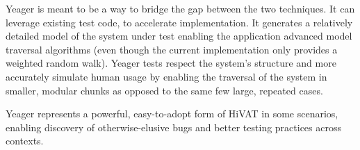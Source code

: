 Yeager is meant to be a way to bridge the gap between the two techniques. It can leverage existing test code, to accelerate implementation. It generates a relatively detailed model of the system under test enabling the application advanced model traversal algorithms (even though the current implementation only provides a weighted random walk). Yeager tests respect the system's structure and more accurately simulate human usage by enabling the traversal of the system in smaller, modular chunks as opposed to the same few large, repeated cases.

Yeager represents a powerful, easy-to-adopt form of HiVAT in some scenarios, enabling discovery of otherwise-elusive bugs and better testing practices across contexts.
